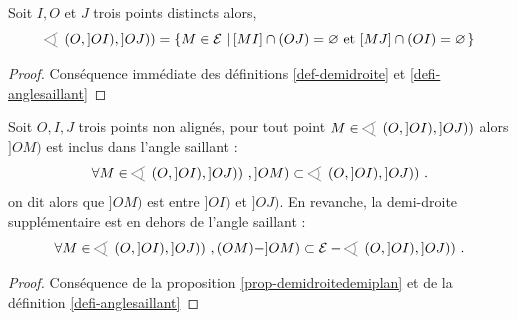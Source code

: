 \begin{prop}\label{prop-anglesaillantensemble}
    Soit $I, O$ et $J$ trois points distincts alors,
    \begin{equation*}
        \anglesaillant\left({O},{]OI)},{]OJ)}\right) = \ensemble{M\in\mathcal{E}}{[MI]\cap (OJ)=\varnothing \text{ et }[MJ]\cap (OI)=\varnothing} 
    \end{equation*}
    \begin{proof}
        Conséquence immédiate des définitions \ref{def-demidroite} et \ref{defi-anglesaillant}
    \end{proof}
\end{prop}
\begin{prop}\label{prop-demidroitsecteurangle}
    Soit $O,I,J$ trois points non alignés, pour tout point $M \in \anglesaillant\left({O},{]OI)},{]OJ)}\right)$  alors $]OM)$ est inclus dans l'angle saillant :
    \begin{equation*}
        \forall M \in \anglesaillant\left({O},{]OI)},{]OJ)}\right)\,, ]OM) \subset \anglesaillant\left({O},{]OI)},{]OJ)}\right) \,.
    \end{equation*}
    on dit alors que $]OM)$ est entre $]OI)$ et $]OJ)$. En revanche, la demi-droite supplémentaire est en dehors de l'angle saillant :
    \begin{equation*}
        \forall M \in \anglesaillant\left({O},{]OI)},{]OJ)}\right)\,, (OM)-]OM) \subset \mathcal{E}-\anglesaillant\left({O},{]OI)},{]OJ)}\right) \,.
    \end{equation*}
\begin{proof}
    Conséquence de la proposition \ref{prop-demidroitedemiplan} et de la définition \ref{defi-anglesaillant} 
\end{proof}
\end{prop}
